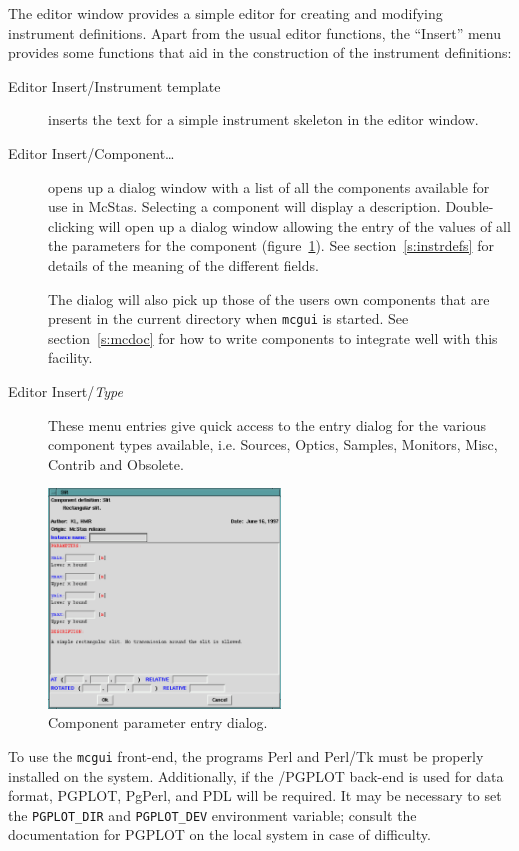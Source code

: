 The editor window provides a simple editor for creating and modifying
instrument definitions. Apart from the usual editor functions, the
``Insert'' menu provides some functions that aid in the construction of
the instrument definitions:
\begin{description}
\item[Editor Insert/Instrument template] inserts the text for a simple instrument
  skeleton in the editor window.
\item[Editor Insert/Component\ldots] opens up a dialog window with a list of all
  the components available for use in McStas. Selecting a component will
  display a description. Double-clicking will open up a dialog window
  allowing the entry of the values of all the parameters for the
  component (figure~\ref{f:comp_dialog}). See section~\ref{s:instrdefs}
  for details of the meaning of the different fields.

The dialog will also pick up those of the users own components that are
  present in the current directory when \verb+mcgui+ is started. See
  section~\ref{s:mcdoc} for how to write components to integrate well
  with this facility.
\item[Editor Insert/\textit{Type}] These menu entries give quick access to the entry
  dialog for the various component types available, i.e. Sources,
  Optics, Samples, Monitors, Misc, Contrib and Obsolete.
\end{description}
\begin{figure}[tbp]
  \begin{center}
    \includegraphics[width=0.55\textwidth]{figures/comp_dialog.eps}
    \caption{Component parameter entry dialog.}
    \label{f:comp_dialog}
  \end{center}
\end{figure}

To use the \verb+mcgui+ front-end, the programs Perl and Perl/Tk must
be properly installed on the system. Additionally, if the \MCS /PGPLOT
back-end is used for data format, PGPLOT, PgPerl, and PDL will be
required.  It may be necessary to set the
\verb+PGPLOT_DIR+ and \verb+PGPLOT_DEV+ environment variable; consult
the documentation for PGPLOT on the local system in case of
difficulty. 

